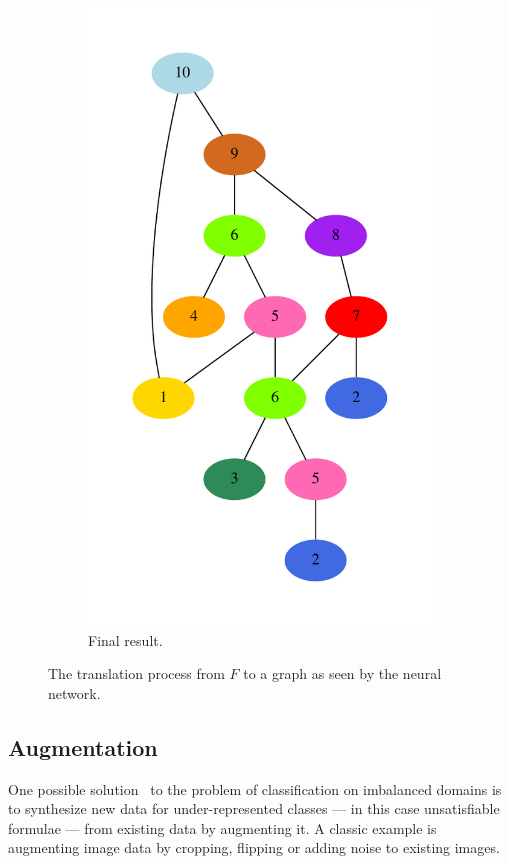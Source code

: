 \documentclass[runningheads]{llncs}
\begin{document}
\begin{figure}
\begin{subfigure}{.3\textwidth}
		\includegraphics[width=\linewidth]{translation-undirected}
		\caption{Final result.}
	\end{subfigure}
	\caption{The translation process from \(F\) to a graph as seen by the neural network.}
	\label{figure:translation}
\end{figure}

\subsection{Augmentation}
One possible solution~\cite{imbalanced} to the problem of classification on imbalanced domains is to synthesize new data for under-represented classes --- in this case unsatisfiable formulae --- from existing data by augmenting it.
A classic example is augmenting image data by cropping, flipping or adding noise to existing images.
\end{document}
